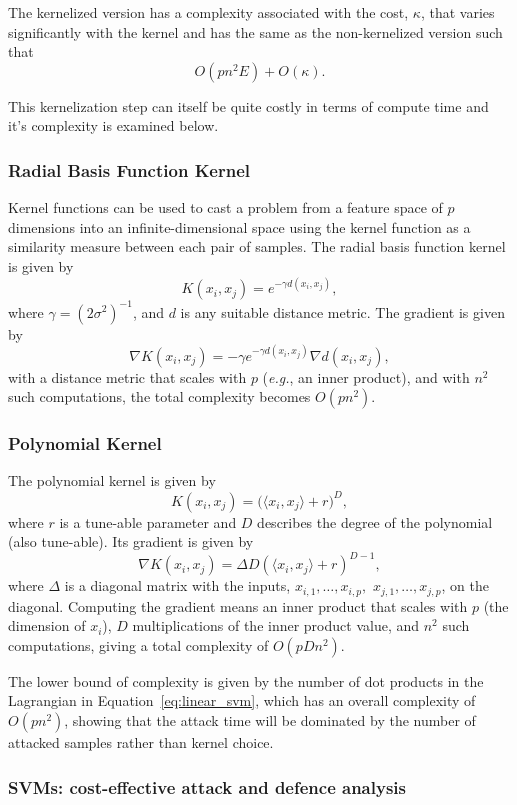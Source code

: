 \documentclass[fonts]{icst}
\begin{document}
The kernelized version has a complexity associated with the cost, $\kappa$, that varies significantly with the kernel and has the same  as the non-kernelized version such that
$$
    O(pn^2 E) + O(\kappa).
$$

This kernelization step can itself be quite costly in terms of compute time and it's complexity is examined below.

\subsubsection{Radial Basis Function Kernel}

Kernel functions can be used to cast a problem from a feature space of $p$ dimensions into an infinite-dimensional space using the kernel function as a similarity measure between each pair of samples.
The radial basis function kernel is given by
$$
    K(x_i, x_j) = e^{-\gamma d(x_i, x_j)},
$$
where $\gamma = (2 \sigma^2)^{-1}$, and $d$ is any suitable distance metric.
The gradient is given by
$$
    \nabla K(x_i, x_j) = - \gamma e^{-\gamma d( x_i, x_j )} \nabla d(x_i, x_j),
$$
with a distance metric that scales with $p$ (\textit{e.g.}, an inner product), and with $n^2$ such computations, the total complexity becomes $O(pn^2)$.

\subsubsection{Polynomial Kernel}

The polynomial kernel is given by
$$
    K(x_i, x_j) = \big(\langle x_i, x_j \rangle + r \big)^D,
$$
where $r$ is a tune-able parameter and $D$ describes the degree of the polynomial (also tune-able).
Its gradient is given by
$$
    \nabla K(x_i, x_j) = \Delta D(\langle x_i, x_j \rangle + r)^{D-1},
$$
where $\Delta$ is a diagonal matrix with the inputs, $x_{i,1},\ldots,x_{i,p},$ $x_{j,1},\ldots,x_{j,p}$, on the diagonal.
Computing the gradient means an inner product that scales with $p$ (the dimension of $x_i$), $D$ multiplications of the inner product value, and $n^2$ such computations, giving a total complexity of $O(pDn^2)$.

The lower bound of complexity is given by the number of dot products in the Lagrangian in Equation~\ref{eq:linear_svm}, which has an overall complexity of $O(pn^2)$, showing that the attack time will be dominated by the number of attacked samples rather than kernel choice.


\subsubsection{SVMs: cost-effective attack and defence analysis}
\label{model}
\end{document}

